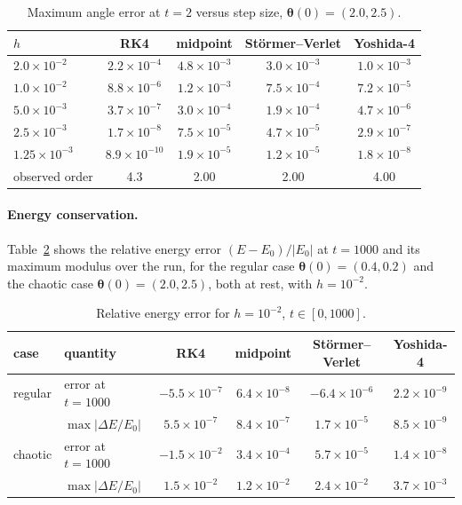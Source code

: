 \documentclass[11pt,a4paper]{book}
\theoremstyle{definition}
\theoremstyle{remark}
\begin{document}
\begin{table}[ht]
\centering
\begin{tabular}{@{}lcccc@{}}
\toprule
$h$ & RK4 & midpoint & St\"ormer--Verlet & Yoshida-4\\
\midrule
$2.0\times10^{-2}$ & $2.2\times10^{-4}$ & $4.8\times10^{-3}$ & $3.0\times10^{-3}$ & $1.0\times10^{-3}$\\
$1.0\times10^{-2}$ & $8.8\times10^{-6}$ & $1.2\times10^{-3}$ & $7.5\times10^{-4}$ & $7.2\times10^{-5}$\\
$5.0\times10^{-3}$ & $3.7\times10^{-7}$ & $3.0\times10^{-4}$ & $1.9\times10^{-4}$ & $4.7\times10^{-6}$\\
$2.5\times10^{-3}$ & $1.7\times10^{-8}$ & $7.5\times10^{-5}$ & $4.7\times10^{-5}$ & $2.9\times10^{-7}$\\
$1.25\times10^{-3}$ & $8.9\times10^{-10}$ & $1.9\times10^{-5}$ & $1.2\times10^{-5}$ & $1.8\times10^{-8}$\\
\midrule
observed order & 4.3 & 2.00 & 2.00 & 4.00\\
\bottomrule
\end{tabular}
\caption{Maximum angle error at $t=2$ versus step size, $\bm\theta(0)=(2.0,2.5)$.}
\label{tab:order}
\end{table}

\paragraph{Energy conservation.} Table~\ref{tab:energy} shows the relative energy error $(E-E_0)/|E_0|$ at
$t=1000$ and its maximum modulus over the run, for the regular case $\bm\theta(0)=(0.4,0.2)$ and the chaotic case
$\bm\theta(0)=(2.0,2.5)$, both at rest, with $h=10^{-2}$.

\begin{table}[ht]
\centering
\begin{tabular}{@{}llcccc@{}}
\toprule
case & quantity & RK4 & midpoint & St\"ormer--Verlet & Yoshida-4\\
\midrule
regular & error at $t=1000$ & $-5.5\times10^{-7}$ & $6.4\times10^{-8}$ & $-6.4\times10^{-6}$ & $2.2\times10^{-9}$\\
        & $\max|\Delta E/E_0|$ & $5.5\times10^{-7}$ & $8.4\times10^{-7}$ & $1.7\times10^{-5}$ & $8.5\times10^{-9}$\\
chaotic & error at $t=1000$ & $-1.5\times10^{-2}$ & $3.4\times10^{-4}$ & $5.7\times10^{-5}$ & $1.4\times10^{-8}$\\
        & $\max|\Delta E/E_0|$ & $1.5\times10^{-2}$ & $1.2\times10^{-2}$ & $2.4\times10^{-2}$ & $3.7\times10^{-3}$\\
\bottomrule
\end{tabular}
\caption{Relative energy error for $h=10^{-2}$, $t\in[0,1000]$.}
\label{tab:energy}
\end{table}
\end{document}
